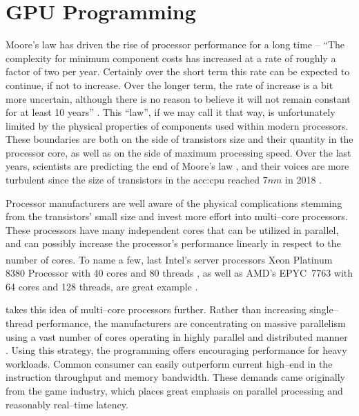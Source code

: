 \chapter{GPU Programming}
\label{chap:gpu}

Moore's law has driven the rise of processor performance for a long time -- \enquote{The complexity for minimum component costs has increased at a rate of roughly a factor of two per year. Certainly over the short term this rate can be expected to continue, if not to increase. Over the longer term, the rate of increase is a bit more uncertain, although there is no reason to believe it will not remain constant for at least 10 years} \citep{MooresLaw}. This \enquote{law}, if we may call it that way, is unfortunately limited by the physical properties of components used within modern processors. 
These boundaries are both on the side of transistors size and their quantity in the processor core, as well as on the side of maximum processing speed. 
Over the last years, scientists are predicting the end of Moore's law \citep{MooresLawEnd}, and their voices are more turbulent since the size of transistors in the \acrfull{acc:cpu} reached $7nm$ in 2018 \citep{SamsungSevenNm}. 

Processor manufacturers are well aware of the physical complications stemming from the transistors' small size and invest more effort into multi--core processors. These processors have many independent cores that can be utilized in parallel, and can possibly increase the processor's performance linearly in respect to the number of cores. To name a few, last Intel's server processors \textsuperscript{\textregistered} Xeon\textsuperscript{\textregistered} Platinum 8380 Processor with 40 cores and 80 threads \citep{IntelXeonPlatinum}, as well as AMD's EPYC\texttrademark\ 7763 with 64 cores and 128 threads, are great example \citep{AMDEpyc}.

 takes this idea of multi--core processors further. Rather than increasing single--thread performance, the \gpu manufacturers are concentrating on massive parallelism using a vast number of cores operating in highly parallel and distributed manner \citep{GPUComputingOwens}. Using this strategy, the \gpu programming offers encouraging performance for heavy workloads. Common consumer  can easily outperform current high--end  in the instruction throughput and memory bandwidth. These demands came originally from the game industry, which places great emphasis on parallel processing and reasonably real--time latency.

